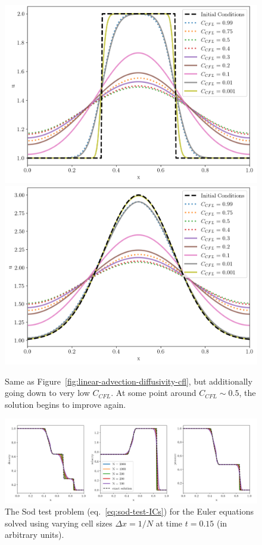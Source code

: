 \begin{figure}
    \centering
    \includegraphics[width=.5\textwidth]{
    ./figures/FV/advection_pwconst/advection-1D-diffusivity-low-cfl-step.png}%
    \includegraphics[width=.5\textwidth]{
    ./figures/FV/advection_pwconst/advection-1D-diffusivity-low-cfl-gaussian.png}%
    \caption[Dependence of the numerical diffusion on $C_{CFL}$ with very low $C_{CFL}$.]{
Same as Figure~\ref{fig:linear-advection-diffusivity-cfl}, but additionally going down to very low
$C_{CFL}$. At some point around $C_{CFL} \sim 0.5$, the solution begins to improve again.
    }%
    \label{fig:linear-advection-diffusivity-low-cfl}
\end{figure}


\begin{figure}
    \includegraphics[width=\textwidth]{
    ./figures/FV/godunov_euler/godunov_euler_diffusivity-dx.png}%
    \caption[Dependence of the numerical diffusion on $\Delta x$ for the Sod test with
    Godunov's method]{
The Sod test problem (eq.~\ref{eq:sod-test-ICs}) for the Euler equations solved using varying
cell sizes $\Delta x = 1/N$ at time $t = 0.15$ (in arbitrary units).
    }%
    \label{fig:godunov-sod-test-diffusivity-dx}
\end{figure}






